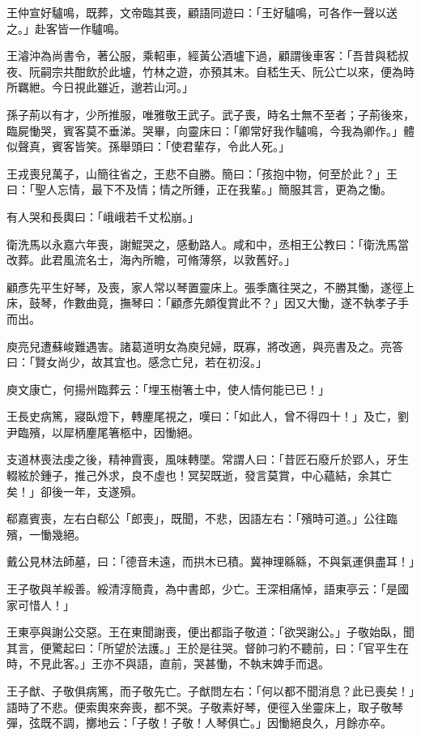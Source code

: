 王仲宣好驢鳴，既葬，文帝臨其喪，顧語同遊曰：「王好驢鳴，可各作一聲以送之。」赴客皆一作驢鳴。

王濬沖為尚書令，著公服，乘軺車，經黃公酒壚下過，顧謂後車客：「吾昔與嵇叔夜、阮嗣宗共酣飲於此壚，竹林之遊，亦預其末。自嵇生夭、阮公亡以來，便為時所羈紲。今日視此雖近，邈若山河。」

孫子荊以有才，少所推服，唯雅敬王武子。武子喪，時名士無不至者；子荊後來，臨屍慟哭，賓客莫不垂涕。哭畢，向靈床曰：「卿常好我作驢鳴，今我為卿作。」體似聲真，賓客皆笑。孫舉頭曰：「使君輩存，令此人死。」

王戎喪兒萬子，山簡往省之，王悲不自勝。簡曰：「孩抱中物，何至於此？」王曰：「聖人忘情，最下不及情；情之所鍾，正在我輩。」簡服其言，更為之慟。

有人哭和長輿曰：「峨峨若千丈松崩。」

衛洗馬以永嘉六年喪，謝鯤哭之，感動路人。咸和中，丞相王公教曰：「衛洗馬當改葬。此君風流名士，海內所瞻，可脩薄祭，以敦舊好。」

顧彥先平生好琴，及喪，家人常以琴置靈床上。張季鷹往哭之，不勝其慟，遂徑上床，鼓琴，作數曲竟，撫琴曰：「顧彥先頗復賞此不？」因又大慟，遂不執孝子手而出。

庾亮兒遭蘇峻難遇害。諸葛道明女為庾兒婦，既寡，將改適，與亮書及之。亮答曰：「賢女尚少，故其宜也。感念亡兒，若在初沒。」

庾文康亡，何揚州臨葬云：「埋玉樹箸土中，使人情何能已已！」

王長史病篤，寢臥燈下，轉麈尾視之，嘆曰：「如此人，曾不得四十！」及亡，劉尹臨殯，以犀柄麈尾箸柩中，因慟絕。

支道林喪法虔之後，精神霣喪，風味轉墜。常謂人曰：「昔匠石廢斤於郢人，牙生輟絃於鍾子，推己外求，良不虛也！冥契既逝，發言莫賞，中心蘊結，余其亡矣！」卻後一年，支遂殞。

郗嘉賓喪，左右白郗公「郎喪」，既聞，不悲，因語左右：「殯時可道。」公往臨殯，一慟幾絕。

戴公見林法師墓，曰：「德音未遠，而拱木已積。冀神理緜緜，不與氣運俱盡耳！」

王子敬與羊綏善。綏清淳簡貴，為中書郎，少亡。王深相痛悼，語東亭云：「是國家可惜人！」

王東亭與謝公交惡。王在東聞謝喪，便出都詣子敬道：「欲哭謝公。」子敬始臥，聞其言，便驚起曰：「所望於法護。」王於是往哭。督帥刁約不聽前，曰：「官平生在時，不見此客。」王亦不與語，直前，哭甚慟，不執末婢手而退。

王子猷、子敬俱病篤，而子敬先亡。子猷問左右：「何以都不聞消息？此已喪矣！」語時了不悲。便索輿來奔喪，都不哭。子敬素好琴，便徑入坐靈床上，取子敬琴彈，弦既不調，擲地云：「子敬！子敬！人琴俱亡。」因慟絕良久，月餘亦卒。

